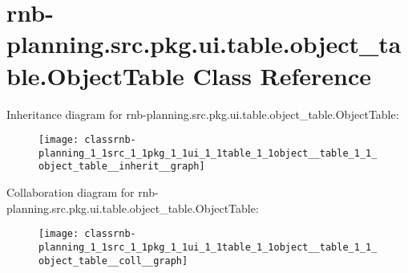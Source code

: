 \hypertarget{classrnb-planning_1_1src_1_1pkg_1_1ui_1_1table_1_1object__table_1_1_object_table}{}\section{rnb-\/planning.src.\+pkg.\+ui.\+table.\+object\+\_\+table.\+Object\+Table Class Reference}
\label{classrnb-planning_1_1src_1_1pkg_1_1ui_1_1table_1_1object__table_1_1_object_table}


Inheritance diagram for rnb-\/planning.src.\+pkg.\+ui.\+table.\+object\+\_\+table.\+Object\+Table\+:
\nopagebreak
\begin{figure}[H]
\begin{center}
\leavevmode
\texttt{[image: classrnb-planning\_1\_1src\_1\_1pkg\_1\_1ui\_1\_1table\_1\_1object\_\_table\_1\_1\_object\_table\_\_inherit\_\_graph]}
\end{center}
\end{figure}


Collaboration diagram for rnb-\/planning.src.\+pkg.\+ui.\+table.\+object\+\_\+table.\+Object\+Table\+:
\nopagebreak
\begin{figure}[H]
\begin{center}
\leavevmode
\texttt{[image: classrnb-planning\_1\_1src\_1\_1pkg\_1\_1ui\_1\_1table\_1\_1object\_\_table\_1\_1\_object\_table\_\_coll\_\_graph]}
\end{center}
\end{figure}
